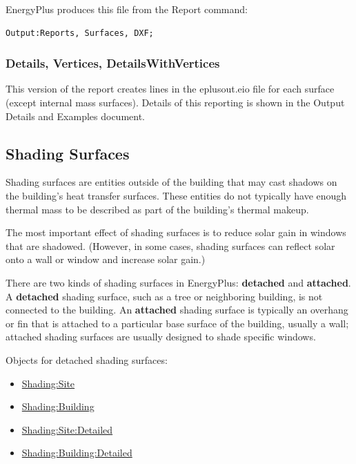 EnergyPlus produces this file from the Report command:

\begin{lstlisting}
Output:Reports, Surfaces, DXF;
\end{lstlisting}

\subsubsection{Details, Vertices, DetailsWithVertices}\label{details-vertices-detailswithvertices}

This version of the report creates lines in the eplusout.eio file for each surface (except internal mass surfaces). Details of this reporting is shown in the Output Details and Examples document.

\subsection{Shading Surfaces}\label{shading-surfaces}

Shading surfaces are entities outside of the building that may cast shadows on the building's heat transfer surfaces. These entities do not typically have enough thermal mass to be described as part of the building's thermal makeup.

The most important effect of shading surfaces is to reduce solar gain in windows that are shadowed. (However, in some cases, shading surfaces can reflect solar onto a wall or window and increase solar gain.)

There are two kinds of shading surfaces in EnergyPlus: \textbf{detached} and \textbf{attached}. A \textbf{detached} shading surface, such as a tree or neighboring building, is not connected to the building. An \textbf{attached} shading surface is typically an overhang or fin that is attached to a particular base surface of the building, usually a wall; attached shading surfaces are usually designed to shade specific windows.

Objects for detached shading surfaces:

\begin{itemize}
\item
  \hyperref[shadingsite-shadingbuilding]{Shading:Site}
\item
  \hyperref[shadingsite-shadingbuilding]{Shading:Building}
\item
  \hyperref[shadingsitedetailed-shadingbuildingdetailed]{Shading:Site:Detailed}
\item
  \hyperref[shadingsitedetailed-shadingbuildingdetailed]{Shading:Building:Detailed}
\end{itemize}

